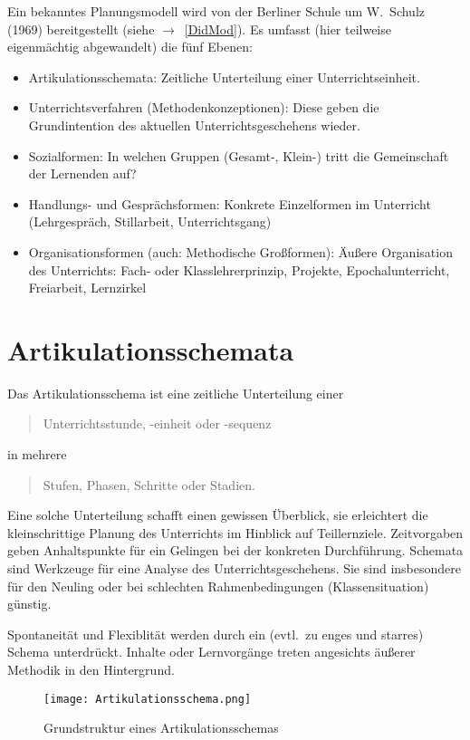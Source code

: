 Ein bekanntes Planungsmodell wird von der Berliner Schule um
W.\ Schulz (1969) bereitgestellt (siehe $\to$~\cref{DidMod}).
Es umfasst (hier teilweise eigenm\"{a}chtig abgewandelt) die
f\"{u}nf Ebenen:
\begin{itemize}
	\item
	Artikulationsschemata: Zeitliche Unterteilung
	einer Unterrichtseinheit.
	\item
	Unterrichtsverfahren (Methodenkonzeptionen):
	Diese geben die Grundintention des aktuellen Unterrichtsgeschehens
	wieder.
	\item
	Sozialformen:
	In welchen Gruppen (Gesamt-, Klein-) tritt die Gemeinschaft der Lernenden auf?
	\item
	Handlungs- und Gespr\"{a}chsformen: Konkrete Einzelformen im
	Unterricht (Lehrgespr\"{a}ch, Stillarbeit, Unterrichtsgang)
	\item
	Organisationsformen (auch: Methodische Gro{\ss}formen):
	\"{A}u{\ss}ere Organisation des Unterrichts: Fach-
	oder Klasslehrerprinzip, Projekte, Epochalunterricht,
	Freiarbeit, Lernzirkel
\end{itemize}

\bip\bip
\section{Artikulationsschemata}


Das Artikulationsschema ist eine zeitliche Unterteilung einer
\begin{quote}
	Unterrichtsstunde, -einheit oder -sequenz
\end{quote}
in mehrere
\begin{quote}
	Stufen, Phasen, Schritte oder Stadien.
\end{quote}

 Eine solche Unterteilung schafft einen gewissen
\"{U}berblick, sie erleichtert die kleinschrittige Planung des
Unterrichts im Hinblick auf Teillernziele.
Zeitvorgaben geben Anhaltspunkte f\"{u}r ein Gelingen bei der
konkreten Durchf\"{u}hrung.
Schemata sind Werkzeuge f\"{u}r eine Analyse des
Unterrichtsgeschehens.
Sie sind insbesondere f\"{u}r den Neuling oder bei schlechten
Rahmenbedingungen (Klassensituation) g\"{u}nstig.

 Spontaneit\"{a}t und Flexiblit\"{a}t werden durch ein
(evtl.\ zu enges und starres) Schema unterdr\"{u}ckt.
Inhalte oder Lernvorg\"{a}nge treten angesichts \"{a}u{\ss}erer
Methodik in den Hintergrund.

\begin{figure}[hb]
	\centering
	\texttt{[image: Artikulationsschema.png]}
	\caption{Grundstruktur eines Artikulationsschemas}
	\label{fig:Artikulationsschema}
\end{figure}


